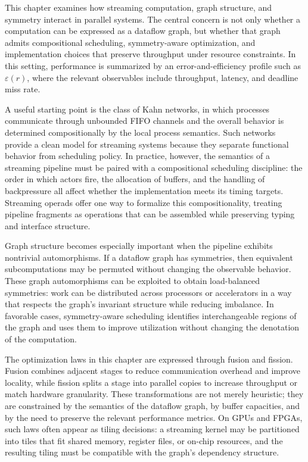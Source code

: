 This chapter examines how streaming computation, graph structure, and symmetry interact in parallel systems. The central concern is not only whether a computation can be expressed as a dataflow graph, but whether that graph admits compositional scheduling, symmetry-aware optimization, and implementation choices that preserve throughput under resource constraints. In this setting, performance is summarized by an error-and-efficiency profile such as \(\varepsilon(r)\), where the relevant observables include throughput, latency, and deadline miss rate.

A useful starting point is the class of Kahn networks, in which processes communicate through unbounded FIFO channels and the overall behavior is determined compositionally by the local process semantics. Such networks provide a clean model for streaming systems because they separate functional behavior from scheduling policy. In practice, however, the semantics of a streaming pipeline must be paired with a compositional scheduling discipline: the order in which actors fire, the allocation of buffers, and the handling of backpressure all affect whether the implementation meets its timing targets. Streaming operads offer one way to formalize this compositionality, treating pipeline fragments as operations that can be assembled while preserving typing and interface structure.

Graph structure becomes especially important when the pipeline exhibits nontrivial automorphisms. If a dataflow graph has symmetries, then equivalent subcomputations may be permuted without changing the observable behavior. These graph automorphisms can be exploited to obtain load-balanced symmetries: work can be distributed across processors or accelerators in a way that respects the graph's invariant structure while reducing imbalance. In favorable cases, symmetry-aware scheduling identifies interchangeable regions of the graph and uses them to improve utilization without changing the denotation of the computation.

The optimization laws in this chapter are expressed through fusion and fission. Fusion combines adjacent stages to reduce communication overhead and improve locality, while fission splits a stage into parallel copies to increase throughput or match hardware granularity. These transformations are not merely heuristic; they are constrained by the semantics of the dataflow graph, by buffer capacities, and by the need to preserve the relevant performance metrics. On GPUs and FPGAs, such laws often appear as tiling decisions: a streaming kernel may be partitioned into tiles that fit shared memory, register files, or on-chip resources, and the resulting tiling must be compatible with the graph's dependency structure.


